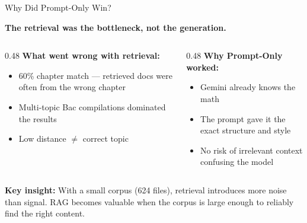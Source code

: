 \documentclass[aspectratio=169, 11pt]{beamer}
\begin{document}
\begin{frame}{Why Did Prompt-Only Win?}

\textbf{The retrieval was the bottleneck, not the generation.}

\bigskip

\begin{columns}[T]
\begin{column}{0.48\textwidth}
\textbf{What went wrong with retrieval:}
\begin{itemize}
    \item 60\% chapter match --- retrieved docs were often from the wrong chapter
    \item Multi-topic Bac compilations dominated the results
    \item Low distance $\neq$ correct topic
\end{itemize}
\end{column}
\begin{column}{0.48\textwidth}
\textbf{Why Prompt-Only worked:}
\begin{itemize}
    \item Gemini already knows the math
    \item The prompt gave it the exact structure and style
    \item No risk of irrelevant context confusing the model
\end{itemize}
\end{column}
\end{columns}

\bigskip

\textbf{Key insight:} With a small corpus (624 files), retrieval introduces more noise
than signal. RAG becomes valuable when the corpus is large enough to reliably
find the right content.

\end{frame}
\end{document}
